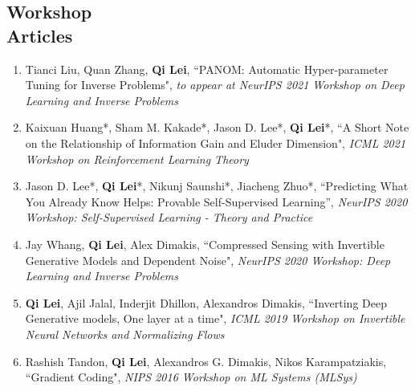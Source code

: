 \documentclass[margin, 10pt]{res} %
\begin{document}
\begin{resume}
\section{Workshop\\Articles}
\begin{enumerate}
	\item{Tianci Liu, Quan Zhang, \textbf{Qi Lei}, ``PANOM: Automatic Hyper-parameter Tuning for Inverse Problems", \textit{to appear at NeurIPS 2021 Workshop on Deep Learning and Inverse Problems} }
	\item {Kaixuan Huang*, Sham M. Kakade*, Jason D. Lee*, \textbf{Qi Lei}*,  ``A Short Note on the Relationship of Information Gain and Eluder Dimension", \textit{ICML 2021 Workshop on Reinforcement Learning Theory} }
	\item {Jason D. Lee*, \textbf{Qi Lei}*, Nikunj Saunshi*, Jiacheng Zhuo*, ``Predicting What You Already Know Helps: Provable Self-Supervised Learning”, \textit{NeurIPS 2020 Workshop: Self-Supervised Learning - Theory and Practice}}
	
\item{Jay Whang, \textbf{Qi Lei}, Alex Dimakis, 	``Compressed Sensing with Invertible Generative Models and Dependent Noise", \textit{NeurIPS 2020 Workshop: Deep Learning and Inverse Problems}
}

\item{\textbf{Qi Lei}, Ajil Jalal, Inderjit Dhillon, Alexandros Dimakis, ``Inverting Deep Generative models, One layer at a time", \textit{ICML 2019 Workshop on Invertible Neural Networks and Normalizing Flows} 	}
	
\item{Rashish Tandon, \textbf{Qi Lei}, Alexandros G. Dimakis, Nikos Karampatziakis,	``Gradient Coding", \textit{NIPS 2016 Workshop on ML Systems (MLSys)} 
}
	
\end{enumerate} 

\begin{comment}
\section{Under\\Review\\Preprints}
\begin{enumerate}

\item{Kurtland Chua, \textbf{Qi Lei}, Jason D Lee. ``Provable Hierarchy-Based Meta-Reinforcement Learning", \textit{arXiv preprint} }


\end{comment}
\end{resume}
\end{document}
